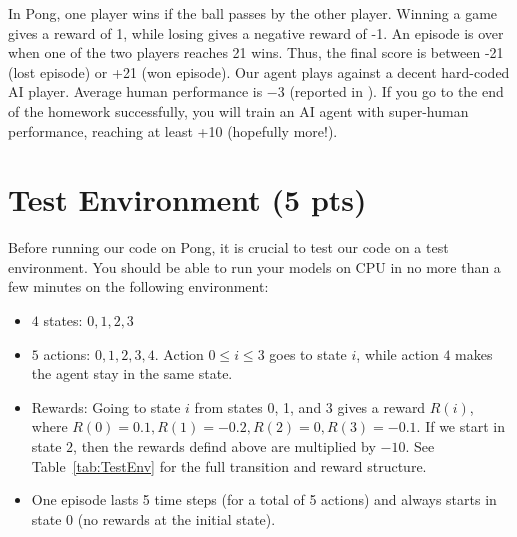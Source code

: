 \documentclass{article}
\begin{document}
In Pong, one player wins if the ball passes by the other player. Winning a game gives a reward of 1, while losing gives a negative reward of -1. An episode is over when one of the two players reaches 21  wins. Thus, the final score is between -21 (lost episode) or +21 (won episode). Our agent plays against a decent hard-coded AI player. Average human performance is $ -3 $ (reported in \cite{mnih-atari-2013}). If you go to the end of the homework successfully, you will train an AI agent with super-human performance, reaching at least +10 (hopefully more!).

\section{Test Environment (5 pts)}
Before running our code on Pong, it is crucial to test our code on a test environment. You should be able to run your models on CPU in no more than a few minutes on the following environment:

\begin{itemize}
\item $ 4 $ states: $ 0, 1, 2, 3 $
\item $ 5 $ actions: $ 0, 1, 2, 3, 4 $. Action $ 0 \leq i \leq 3 $ goes to state $ i $, while action $ 4 $ makes the agent stay in the same state.
\item Rewards: Going to state $ i $ from states 0, 1, and 3 gives a reward $R(i) $, where $R(0) = 0.1, R(1) = -0.2, R(2) = 0, R(3) = -0.1 $. If we start in state $ 2 $, then the rewards defind above are multiplied by $ - 10 $.  See Table~\ref{tab:TestEnv} for the full transition and reward structure. 
\item One episode lasts 5 time steps (for a total of 5 actions) and always starts in state $ 0 $ (no rewards at the initial state).        
\end{itemize}
\end{document}
